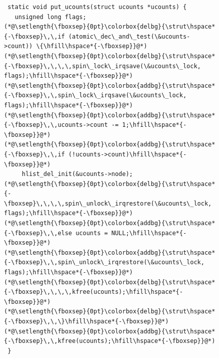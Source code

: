 \documentclass[sigconf]{acmart}
\begin{document}
\begin{figure}[ht]
\begin{lstlisting}
 static void put_ucounts(struct ucounts *ucounts) {
   unsigned long flags;
(*@\setlength{\fboxsep}{0pt}\colorbox{delbg}{\strut\hspace*{-\fboxsep}\,\,if (atomic\_dec\_and\_test(\&ucounts->count)) \{\hfill\hspace*{-\fboxsep}}@*)
(*@\setlength{\fboxsep}{0pt}\colorbox{delbg}{\strut\hspace*{-\fboxsep}\,\,\,\,spin\_lock\_irqsave(\&ucounts\_lock, flags);\hfill\hspace*{-\fboxsep}}@*)
(*@\setlength{\fboxsep}{0pt}\colorbox{addbg}{\strut\hspace*{-\fboxsep}\,\,spin\_lock\_irqsave(\&ucounts\_lock, flags);\hfill\hspace*{-\fboxsep}}@*)
(*@\setlength{\fboxsep}{0pt}\colorbox{addbg}{\strut\hspace*{-\fboxsep}\,\,ucounts->count -= 1;\hfill\hspace*{-\fboxsep}}@*)
(*@\setlength{\fboxsep}{0pt}\colorbox{addbg}{\strut\hspace*{-\fboxsep}\,\,if (!ucounts->count)\hfill\hspace*{-\fboxsep}}@*)
     hlist_del_init(&ucounts->node);
(*@\setlength{\fboxsep}{0pt}\colorbox{delbg}{\strut\hspace*{-\fboxsep}\,\,\,\,spin\_unlock\_irqrestore(\&ucounts\_lock, flags);\hfill\hspace*{-\fboxsep}}@*)
(*@\setlength{\fboxsep}{0pt}\colorbox{addbg}{\strut\hspace*{-\fboxsep}\,\,else ucounts = NULL;\hfill\hspace*{-\fboxsep}}@*)
(*@\setlength{\fboxsep}{0pt}\colorbox{addbg}{\strut\hspace*{-\fboxsep}\,\,spin\_unlock\_irqrestore(\&ucounts\_lock, flags);\hfill\hspace*{-\fboxsep}}@*)
(*@\setlength{\fboxsep}{0pt}\colorbox{delbg}{\strut\hspace*{-\fboxsep}\,\,\,\,kfree(ucounts);\hfill\hspace*{-\fboxsep}}@*)
(*@\setlength{\fboxsep}{0pt}\colorbox{delbg}{\strut\hspace*{-\fboxsep}\,\,\}\hfill\hspace*{-\fboxsep}}@*)
(*@\setlength{\fboxsep}{0pt}\colorbox{addbg}{\strut\hspace*{-\fboxsep}\,\,kfree(ucounts);\hfill\hspace*{-\fboxsep}}@*)
 }
\end{lstlisting}
\end{figure}
\end{document}
